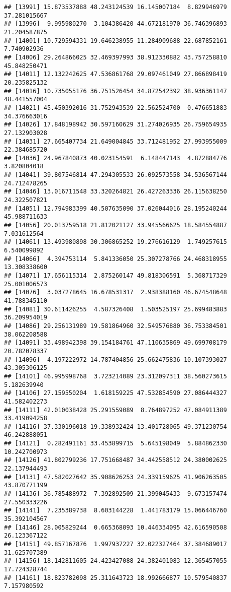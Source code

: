 \documentclass[
]{article}
\begin{document}
\begin{verbatim}
## [13991] 15.873537888 48.243124539 16.145007184  8.829946979 37.281015667
## [13996]  9.995980270  3.104386420 44.672181970 36.746396893 21.204587875
## [14001] 10.729594331 19.646238955 11.284909688 22.687852161  7.740902936
## [14006] 29.264866025 32.469397993 38.912330882 43.757258810 45.848250471
## [14011] 12.132242625 47.536861768 29.097461049 27.866898419 20.235825132
## [14016] 10.735055176 36.751526454 34.872542392 38.936361147 48.441557004
## [14021] 45.450392016 31.752943539 22.562524700  0.476651883 34.376663016
## [14026] 17.848198942 30.597160629 31.274026935 26.759654935 27.132903028
## [14031] 27.665407734 21.649004845 33.712481952 27.993955009 22.384685720
## [14036] 24.967840873 40.023154591  6.148447143  4.872884776  3.820804018
## [14041] 39.807546814 47.294305533 26.092573558 34.536567144 24.712478265
## [14046] 13.016711548 33.320264821 26.427263336 26.115638250 24.322507821
## [14051] 12.794983399 40.507635090 37.026044016 28.195240244 45.988711633
## [14056] 20.013759518 21.812021127 33.945566625 18.584554887  7.031612564
## [14061] 13.493980898 30.306865252 19.276616129  1.749257615  6.540099892
## [14066]  4.394753114  5.841336050 25.307278766 24.468318955 13.308338600
## [14071] 17.656115314  2.875260147 49.818306591  5.368717329 25.001006573
## [14076]  3.037278645 16.678531317  2.938388160 46.674548648 41.788345110
## [14081] 30.611426255  4.587326408  1.503525197 25.699483883 36.209954019
## [14086] 29.256131989 19.581864960 32.549576880 36.753384501 38.062208588
## [14091] 33.498942398 39.154184761 47.110635869 49.699708179 20.782078337
## [14096]  4.197222972 14.787404856 25.662475836 10.107393027 43.305306125
## [14101] 46.995998768  3.723214089 23.312097311 38.560273615  5.182639940
## [14106] 27.159550204  1.618159225 47.532854590 27.086444327 41.582402273
## [14111] 42.010038428 25.291559089  8.764897252 47.084911389 33.419094258
## [14116] 37.330196018 19.338932424 13.401728065 49.371230754 46.242888051
## [14121]  0.282491161 33.453899715  5.645198049  5.884862330 10.242700973
## [14126] 41.802799236 17.751668487 34.442558512 24.380002625 22.137944493
## [14131] 47.582027642 35.908626253 24.339159625 41.906263505 43.870771199
## [14136] 36.785488972  7.392892509 21.399045433  9.673157474 27.550333226
## [14141]  7.235389738  8.603144228  1.441783179 15.066446760 35.392104567
## [14146] 28.005829244  0.665368093 10.446334095 42.616590508 26.123367122
## [14151] 49.857167876  1.997937227 32.022327464 37.384689017 31.625707389
## [14156] 18.142811605 24.423427088 24.382401083 12.365457055 17.724328744
## [14161] 18.823782098 25.311643723 18.992666877 10.579540837  7.157980592

\end{verbatim}
\end{document}
